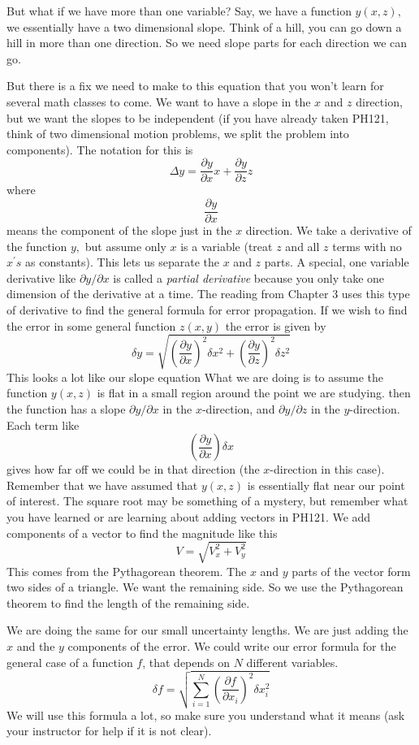 \documentclass{book}
\begin{document}
But what if we have more than one variable? Say, we have a function $y(x,z),$
we essentially have a two dimensional slope. Think of a hill, you can go down
a hill in more than one direction. So we need slope parts for each direction
we can go.

But there is a fix we need to make to this equation that you won't learn for
several math classes to come. We want to have a slope in the $x$ and $z$
direction, but we want the slopes to be independent (if you have already taken
PH121, think of two dimensional motion problems, we split the problem into
components). The notation for this is
\[
\Delta y=\frac{\partial y}{\partial x}x+\frac{\partial y}{\partial z}z
\]
where
\[
\frac{\partial y}{\partial x}
\]
means the component of the slope just in the $x$ direction. We take a
derivative of the function $y,$ but assume only $x$ is a variable (treat $z$
and all $z$ terms with no $x^{\prime}s$ as constants). This lets us separate
the $x$ and $z$ parts. A special, one variable derivative like $\partial
y/\partial x$ is called a \emph{partial derivative} because you only take one
dimension of the derivative at a time. The reading from Chapter 3 uses this
type of derivative to find the general formula for error propagation. If we
wish to find the error in some general function $z\left(  x,y\right)  $ the
error is given by
\[
\delta y=\sqrt{\left(  \frac{\partial y}{\partial x}\right)  ^{2}\delta
x^{2}+\left(  \frac{\partial y}{\partial z}\right)  ^{2}\delta z^{2}}
\]
This looks a lot like our slope equation What we are doing is to assume the
function $y\left(  x,z\right)  $ is flat in a small region around the point we
are studying. then the function has a slope $\partial y/\partial x$ in the $x
$-direction, and $\partial y/\partial z$ in the $y$-direction. Each term like
\[
\left(  \frac{\partial y}{\partial x}\right)  \delta x
\]
gives how far off we could be in that direction (the $x$-direction in this
case). Remember that we have assumed that $y\left(  x,z\right)  $ is
essentially flat near our point of interest. The square root may be something
of a mystery, but remember what you have learned or are learning about adding
vectors in PH121. We add components of a vector to find the magnitude like
this
\[
V=\sqrt{V_{x}^{2}+V_{y}^{2}}
\]
This comes from the Pythagorean theorem. The $x$ and $y$ parts of the vector
form two sides of a triangle. We want the remaining side. So we use the
Pythagorean theorem to find the length of the remaining side.

We are doing the same for our small uncertainty lengths. We are just adding
the $x$ and the $y$ components of the error. We could write our error formula
for the general case of a function $f$, that depends on $N$ different
variables.
\[
\delta f=\sqrt{\sum_{i=1}^{N}\left(  \frac{\partial f}{\partial x_{i}}\right)
^{2}\delta x_{i}^{2}}
\]
We will use this formula a lot, so make sure you understand what it means (ask
your instructor for help if it is not clear).
\end{document}
